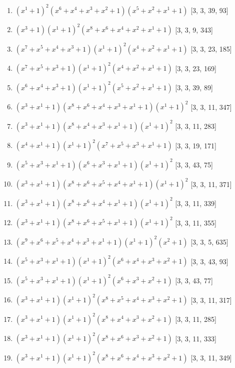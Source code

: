\documentclass[10pt,twocolumn]{article}
\begin{document}
\begin{enumerate}
\item $(x^{1} + 1)^{2}(x^{6} + x^{4} + x^{3} + x^{2} + 1)(x^{5} + x^{2} + x^{1} + 1)$  [3, 3, 39, 93]
\item $(x^{3} + 1)(x^{1} + 1)^{2}(x^{8} + x^{6} + x^{4} + x^{2} + x^{1} + 1)$  [3, 3, 9, 343]
\item $(x^{7} + x^{5} + x^{4} + x^{3} + 1)(x^{1} + 1)^{2}(x^{4} + x^{2} + x^{1} + 1)$  [3, 3, 23, 185]
\item $(x^{7} + x^{5} + x^{3} + 1)(x^{1} + 1)^{2}(x^{4} + x^{2} + x^{1} + 1)$  [3, 3, 23, 169]
\item $(x^{6} + x^{4} + x^{3} + 1)(x^{1} + 1)^{2}(x^{5} + x^{2} + x^{1} + 1)$  [3, 3, 39, 89]
\item $(x^{3} + x^{1} + 1)(x^{8} + x^{6} + x^{4} + x^{3} + x^{1} + 1)(x^{1} + 1)^{2}$  [3, 3, 11, 347]
\item $(x^{3} + x^{1} + 1)(x^{8} + x^{4} + x^{3} + x^{1} + 1)(x^{1} + 1)^{2}$  [3, 3, 11, 283]
\item $(x^{4} + x^{1} + 1)(x^{1} + 1)^{2}(x^{7} + x^{5} + x^{3} + x^{1} + 1)$  [3, 3, 19, 171]
\item $(x^{5} + x^{3} + x^{1} + 1)(x^{6} + x^{3} + x^{1} + 1)(x^{1} + 1)^{2}$  [3, 3, 43, 75]
\item $(x^{3} + x^{1} + 1)(x^{8} + x^{6} + x^{5} + x^{4} + x^{1} + 1)(x^{1} + 1)^{2}$  [3, 3, 11, 371]
\item $(x^{3} + x^{1} + 1)(x^{8} + x^{6} + x^{4} + x^{1} + 1)(x^{1} + 1)^{2}$  [3, 3, 11, 339]
\item $(x^{3} + x^{1} + 1)(x^{8} + x^{6} + x^{5} + x^{1} + 1)(x^{1} + 1)^{2}$  [3, 3, 11, 355]
\item $(x^{9} + x^{6} + x^{5} + x^{4} + x^{3} + x^{1} + 1)(x^{1} + 1)^{2}(x^{2} + 1)$  [3, 3, 5, 635]
\item $(x^{5} + x^{3} + x^{1} + 1)(x^{1} + 1)^{2}(x^{6} + x^{4} + x^{3} + x^{2} + 1)$  [3, 3, 43, 93]
\item $(x^{5} + x^{3} + x^{1} + 1)(x^{1} + 1)^{2}(x^{6} + x^{3} + x^{2} + 1)$  [3, 3, 43, 77]
\item $(x^{3} + x^{1} + 1)(x^{1} + 1)^{2}(x^{8} + x^{5} + x^{4} + x^{3} + x^{2} + 1)$  [3, 3, 11, 317]
\item $(x^{3} + x^{1} + 1)(x^{1} + 1)^{2}(x^{8} + x^{4} + x^{3} + x^{2} + 1)$  [3, 3, 11, 285]
\item $(x^{3} + x^{1} + 1)(x^{1} + 1)^{2}(x^{8} + x^{6} + x^{3} + x^{2} + 1)$  [3, 3, 11, 333]
\item $(x^{3} + x^{1} + 1)(x^{1} + 1)^{2}(x^{8} + x^{6} + x^{4} + x^{3} + x^{2} + 1)$  [3, 3, 11, 349]

\end{enumerate}
\end{document}
